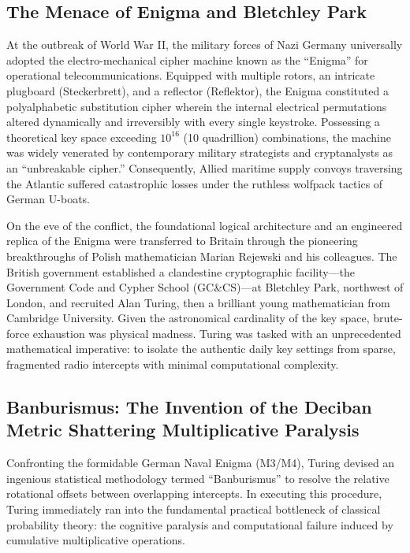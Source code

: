     \subsection{The Menace of Enigma and Bletchley Park}
    At the outbreak of World War II, the military forces of Nazi Germany universally adopted the electro-mechanical cipher machine known as the ``Enigma'' for operational telecommunications.
    Equipped with multiple rotors, an intricate plugboard (Steckerbrett), and a reflector (Reflektor), the Enigma constituted a polyalphabetic substitution cipher wherein the internal electrical permutations altered dynamically and irreversibly with every single keystroke.
    Possessing a theoretical key space exceeding $10^{16}$ (10 quadrillion) combinations, the machine was widely venerated by contemporary military strategists and cryptanalysts as an ``unbreakable cipher.''
    Consequently, Allied maritime supply convoys traversing the Atlantic suffered catastrophic losses under the ruthless wolfpack tactics of German U-boats.

    On the eve of the conflict, the foundational logical architecture and an engineered replica of the Enigma were transferred to Britain through the pioneering breakthroughs of Polish mathematician Marian Rejewski and his colleagues.
    The British government established a clandestine cryptographic facility—the Government Code and Cypher School (GC\&CS)—at Bletchley Park, northwest of London, and recruited Alan Turing, then a brilliant young mathematician from Cambridge University.
    Given the astronomical cardinality of the key space, brute-force exhaustion was physical madness.
    Turing was tasked with an unprecedented mathematical imperative: to isolate the authentic daily key settings from sparse, fragmented radio intercepts with minimal computational complexity.

    \subsection{Banburismus: The Invention of the Deciban Metric Shattering Multiplicative Paralysis}
    Confronting the formidable German Naval Enigma (M3/M4), Turing devised an ingenious statistical methodology termed ``Banburismus'' to resolve the relative rotational offsets between overlapping intercepts.
    In executing this procedure, Turing immediately ran into the fundamental practical bottleneck of classical probability theory: the cognitive paralysis and computational failure induced by cumulative multiplicative operations.

